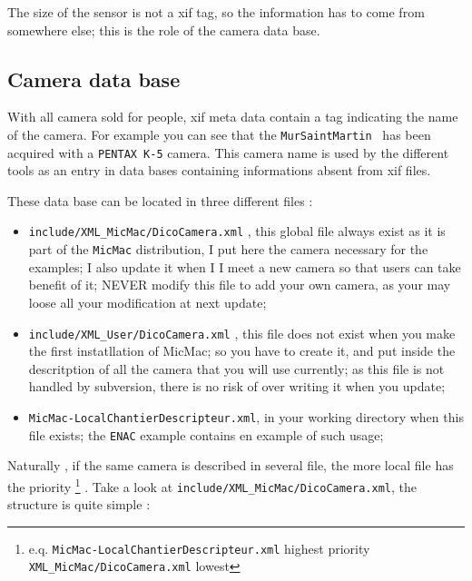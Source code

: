 The size of the sensor is not a xif tag, so the information has to come from
somewhere else; this is the role of the camera data base.


\subsection{Camera data base}
\label{CamDB}

With all camera sold for people, xif meta data contain a tag indicating the 
name of the camera.  For example you can see that the {\tt MurSaintMartin }
has been acquired with a {\tt PENTAX K-5} camera. This camera name is
used by the different tools as an entry in data bases containing  informations
absent from xif files.

These data base can be located in three different files :

\begin{itemize}
   \item  {\tt  include/XML\_MicMac/DicoCamera.xml} , this global file always exist as
         it is part of the {\tt MicMac} distribution, I put here the camera necessary
         for the examples; I also update it when I  I meet a new camera 
         so that  users can take benefit of it;
         NEVER modify this file to add your own camera, as your may loose all your
         modification at next update; 
   
   \item  {\tt  include/XML\_User/DicoCamera.xml} , this file does not exist
         when you make the first instatllation of MicMac; so you have to create it,
         and put inside the descritption of all the camera that you will use
         currently; as this file is not handled by subversion, there is no risk
         of over writing it when you update;

   \item  {\tt  MicMac-LocalChantierDescripteur.xml},  in your working 
          directory when this file exists; the {\tt ENAC} example contains
          en example of such usage;
\end{itemize}

Naturally , if the same camera is described in several file, the more local file has the 
priority \footnote{e.q. {\tt MicMac-LocalChantierDescripteur.xml} highest priority
{\tt XML\_MicMac/DicoCamera.xml} lowest} .
Take a look at  {\tt  include/XML\_MicMac/DicoCamera.xml}, the structure is quite
simple :

